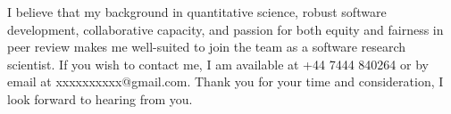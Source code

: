 


I believe that my background in quantitative science, robust software
development, collaborative capacity, and passion for both equity and 
fairness in peer review makes me well-suited to join the team as a software
research scientist. If you wish to contact me, I am available at +44 7444 840264
or by email at xxxxxxxxxx@gmail.com. Thank you for your time and consideration,
I look forward to hearing from you. 


\makeletterclosing %




